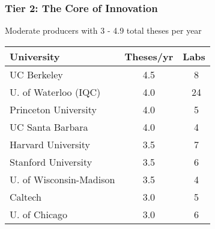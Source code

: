 \documentclass[aspectratio=169]{beamer}
\newcommand{\tabletext}{\small}
\begin{document}
\begin{frame}
    \frametitle{Tier 2: The Core of Innovation}
    Moderate producers with 3 - 4.9 total theses per year
    
    \begin{table}
        \centering
        \tabletext
        \begin{tabularx}{\textwidth}{
            l
            S[table-format=1.1]
            S[table-format=2.0, table-space-text-pre=~]
        }
            \toprule
            \textbf{University} & {\textbf{Theses/yr}} & {\textbf{Labs}} \\
            \midrule
            UC Berkeley & 4.5 & ~8 \\
            U. of Waterloo (IQC) & 4.0 & ~24 \\
            Princeton University & 4.0 & ~5 \\
            UC Santa Barbara & 4.0 & ~4 \\
            Harvard University & 3.5 & ~7 \\
            Stanford University & 3.5 & ~6 \\
            U. of Wisconsin-Madison & 3.5 & ~4 \\
            Caltech & 3.0 & ~5 \\
            U. of Chicago & 3.0 & ~6 \\
            \bottomrule
        \end{tabularx}
    \end{table}
\end{frame}
\end{document}

